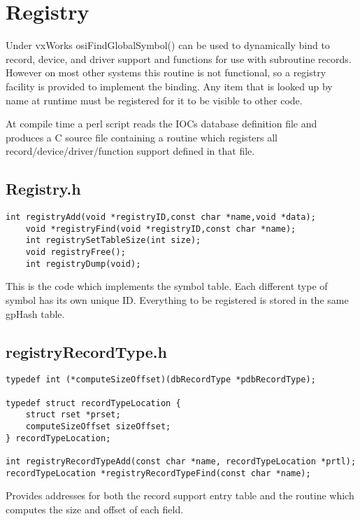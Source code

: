 \chapter{Registry}

Under vxWorks osiFindGlobalSymbol() can be used to dynamically bind to record, device, and driver support and 
functions for use with subroutine records. However on most other systems this routine is not functional, so a registry 
facility is provided to implement the binding. Any item that is looked up by name at runtime must be registered for it to be 
visible to other code.

At compile time a perl script reads the IOCs database definition file and produces a C source file containing a routine 
which registers all record/device/driver/function support defined in that file.

\section{Registry.h}

\begin{verbatim}
int registryAdd(void *registryID,const char *name,void *data);
    void *registryFind(void *registryID,const char *name);
    int registrySetTableSize(int size);
    void registryFree();
    int registryDump(void);
\end{verbatim}
This is the code which implements the symbol table. Each different type of symbol has its own unique ID. Everything to 
be registered is stored in the same gpHash table.

\section{registryRecordType.h}

\begin{verbatim}typedef int (*computeSizeOffset)(dbRecordType *pdbRecordType);

typedef struct recordTypeLocation {
    struct rset *prset;
    computeSizeOffset sizeOffset;
} recordTypeLocation;

int registryRecordTypeAdd(const char *name, recordTypeLocation *prtl);
recordTypeLocation *registryRecordTypeFind(const char *name);
\end{verbatim}
Provides addresses for both the record support entry table and the routine which computes the size and offset of each 
field.

